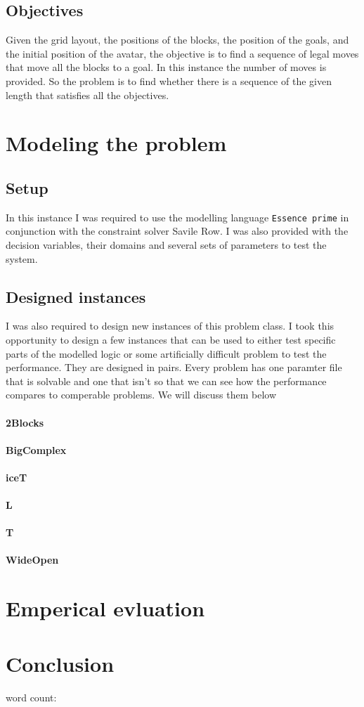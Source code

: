 \documentclass[british]{article}
\newcommand{\code}[1]{\texttt{#1}}
\begin{document}
\subsection{Objectives}
Given the grid layout, the positions of the blocks, the position of the goals, and the initial position of the avatar, the objective is to find a sequence of legal moves that move all the blocks to a goal. In this instance the number of moves is provided. So the problem is to find whether there is a sequence of the given length that satisfies all the objectives. 


\section{Modeling the problem}
\label{model}
\subsection{Setup}
In this instance I was required to use the modelling language \code{Essence prime} in conjunction with the constraint solver Savile Row. I was also provided with the decision variables, their domains and several sets of parameters to test the system.   

\subsection{Designed instances}
I was also required to design new instances of this problem class. I took this opportunity to design a few instances that can be used to either test specific parts of the modelled logic or some artificially difficult problem to test the performance. They are designed in pairs. Every problem has one paramter file that is solvable and one that isn't so that we can see how the performance compares to comperable problems. We will discuss them below

	\paragraph{2Blocks}
	\paragraph{BigComplex}
	\paragraph{iceT}
	\paragraph{L}
	\paragraph{T}
	\paragraph{WideOpen}

\section{Emperical evluation}
\label{results}

\section{Conclusion}
\label{conclusion}

 
 
 
word count: 
\printbibliography
\end{document}
